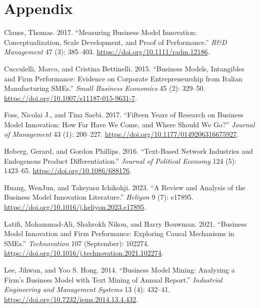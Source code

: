 \documentclass[
]{article}
\newlength{\cslhangindent}
\newenvironment{CSLReferences}[2] %
 {\begin{list}{}{%
  \setlength{\itemindent}{0pt}
  \setlength{\leftmargin}{0pt}
  \setlength{\parsep}{0pt}
  \ifodd #1
   \setlength{\leftmargin}{\cslhangindent}
   \setlength{\itemindent}{-1\cslhangindent}
  \fi
  \setlength{\itemsep}{#2\baselineskip}}}
 {\end{list}}
\begin{document}
\section*{Appendix}\label{appendix}

\label{refs}
\begin{CSLReferences}{1}{0}
Clauss, Thomas. 2017. {``Measuring Business Model Innovation:
Conceptualization, Scale Development, and Proof of Performance.''}
\emph{R\&D Management} 47 (3): 385--403.
\url{https://doi.org/10.1111/radm.12186}.

Cucculelli, Marco, and Cristina Bettinelli. 2015. {``Business Models,
Intangibles and Firm Performance: Evidence on Corporate Entrepreneurship
from {Italian} Manufacturing {SMEs}.''} \emph{Small Business Economics}
45 (2): 329--50. \url{https://doi.org/10.1007/s11187-015-9631-7}.

Foss, Nicolai J., and Tina Saebi. 2017. {``Fifteen {Years} of {Research}
on {Business} {Model} {Innovation}: {How} {Far} {Have} {We} {Come}, and
{Where} {Should} {We} {Go}?''} \emph{Journal of Management} 43 (1):
200--227. \url{https://doi.org/10.1177/0149206316675927}.

Hoberg, Gerard, and Gordon Phillips. 2016. {``Text-{Based} {Network}
{Industries} and {Endogenous} {Product} {Differentiation}.''}
\emph{Journal of Political Economy} 124 (5): 1423--65.
\url{https://doi.org/10.1086/688176}.

Huang, WenJun, and Takeyasu Ichikohji. 2023. {``A Review and Analysis of
the Business Model Innovation Literature.''} \emph{Heliyon} 9 (7):
e17895. \url{https://doi.org/10.1016/j.heliyon.2023.e17895}.

Latifi, Mohammad-Ali, Shahrokh Nikou, and Harry Bouwman. 2021.
{``Business Model Innovation and Firm Performance: {Exploring} Causal
Mechanisms in {SMEs}.''} \emph{Technovation} 107 (September): 102274.
\url{https://doi.org/10.1016/j.technovation.2021.102274}.

Lee, Jihwan, and Yoo S. Hong. 2014. {``Business {Model} {Mining}:
{Analyzing} a {Firm}'s {Business} {Model} with {Text} {Mining} of
{Annual} {Report}.''} \emph{Industrial Engineering and Management
Systems} 13 (4): 432--41.
\url{https://doi.org/10.7232/iems.2014.13.4.432}.


\end{CSLReferences}
\end{document}
